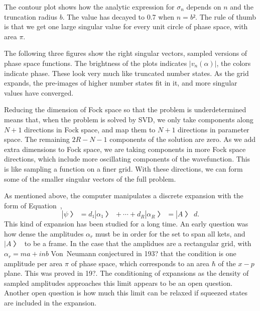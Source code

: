 
The contour plot shows how the analytic expression for $σ_n$ depends on $n$ and the truncation radius $b$.  The value has decayed to 0.7 when $n=b²$.  The rule of thumb is that we get one large singular value for every unit circle of phase space, with area $π$.


The following three figures show the right singular vectors, sampled versions of phase space functions.  The brightness of the plots indicates $|v_n(α)|$, the colors indicate phase.  These look very much like truncated number states.  As the grid expands, the pre-images of higher number states fit in it, and more singular values have converged.


Reducing the dimension of Fock space so that the problem is underdetermined means that, when the problem is solved by SVD, we only take components along $N+1$ directions in Fock space, and map them to $N+1$ directions in parameter space.  The remaining $2R-N-1$ components of the solution are zero.  As we add extra dimensions to Fock space, we are taking components in more Fock space directions, which include more oscillating components of the wavefunction.  This is like sampling a function on a finer grid.  With these directions, we can form some of the smaller singular vectors of the full problem.


As mentioned above, the computer manipulates a discrete expansion with the form of Equation~\Ad,
$$|ψ〉=d₁|α₁〉+⋯+d_R|α_R〉=|A〉d.$$
This kind of expansion has been studied for a long time.  An early question was how dense the amplitudes $α_r$ must be in order for the set to span all kets, and $|A〉$ to be a frame.  In the case that the amplidues are a rectangular grid, with $α_r=ma+inb$ Von~Neumann conjectured in 193? that the condition is one amplitude per area $π$ of phase space, which corresponds to an area $\hbar$ of the $x-p$ plane.  This was proved in 19?.  The conditioning of expansions as the density of sampled amplitudes approaches this limit appears to be an open question.  Another open question is how much this limit can be relaxed if squeezed states are included in the expansion.

